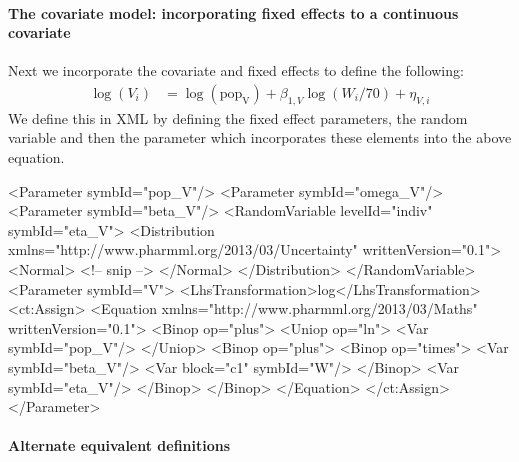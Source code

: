 \documentclass[a4paper,11pt]{article}
\begin{document}
\paragraph{The covariate model: incorporating fixed effects to a continuous covariate}

 Next we incorporate the covariate and fixed effects to define the following:
%
\begin{align}
\log(V_i) &= \log(\mathrm{pop_{V}}) + \beta_{1,V}\log(W_i/70) + \eta_{V,i}
\end{align}
%
We define this in XML by defining the fixed effect parameters, the random
variable and then the parameter which incorporates these elements into
the above equation.
%
\begin{xmlcode}
<Parameter symbId="pop_V"/>
<Parameter symbId="omega_V"/>
<Parameter symbId="beta_V"/>
<RandomVariable levelId="indiv" symbId="eta_V">
    <Distribution xmlns="http://www.pharmml.org/2013/03/Uncertainty"
      writtenVersion="0.1">
        <Normal>
           <!-- snip -->
        </Normal>
    </Distribution>
</RandomVariable>
<Parameter symbId="V">
    <LhsTransformation>log</LhsTransformation>
    <ct:Assign>
        <Equation xmlns="http://www.pharmml.org/2013/03/Maths" writtenVersion="0.1">
            <Binop op="plus">
                <Uniop op="ln">
                    <Var symbId="pop_V"/>
                </Uniop>
                <Binop op="plus">
                    <Binop op="times">
                        <Var symbId="beta_V"/>
                        <Var block="c1" symbId="W"/>
                    </Binop>
                    <Var symbId="eta_V"/>
                </Binop>
            </Binop>
        </Equation>
    </ct:Assign>
</Parameter>
\end{xmlcode}

\paragraph{Alternate equivalent definitions}
\end{document}
